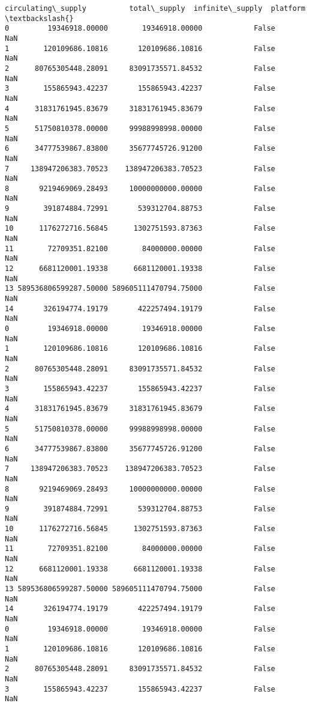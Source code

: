 \documentclass[11pt]{article}
\begin{document}
\begin{tcolorbox}[breakable, size=fbox, boxrule=.5pt, pad at break*=1mm, opacityfill=0]
\begin{Verbatim}[commandchars=\\\{\}]
      circulating\_supply          total\_supply  infinite\_supply  platform  \textbackslash{}
0         19346918.00000        19346918.00000            False       NaN
1        120109686.10816       120109686.10816            False       NaN
2      80765305448.28091     83091735571.84532            False       NaN
3        155865943.42237       155865943.42237            False       NaN
4      31831761945.83679     31831761945.83679            False       NaN
5      51750810378.00000     99988998998.00000            False       NaN
6      34777539867.83800     35677745726.91200            False       NaN
7     138947206383.70523    138947206383.70523            False       NaN
8       9219469069.28493     10000000000.00000            False       NaN
9        391874884.72991       539312704.88753            False       NaN
10      1176272716.56845      1302751593.87363            False       NaN
11        72709351.82100        84000000.00000            False       NaN
12      6681120001.19338      6681120001.19338            False       NaN
13 589536806599287.50000 589605111470794.75000            False       NaN
14       326194774.19179       422257494.19179            False       NaN
0         19346918.00000        19346918.00000            False       NaN
1        120109686.10816       120109686.10816            False       NaN
2      80765305448.28091     83091735571.84532            False       NaN
3        155865943.42237       155865943.42237            False       NaN
4      31831761945.83679     31831761945.83679            False       NaN
5      51750810378.00000     99988998998.00000            False       NaN
6      34777539867.83800     35677745726.91200            False       NaN
7     138947206383.70523    138947206383.70523            False       NaN
8       9219469069.28493     10000000000.00000            False       NaN
9        391874884.72991       539312704.88753            False       NaN
10      1176272716.56845      1302751593.87363            False       NaN
11        72709351.82100        84000000.00000            False       NaN
12      6681120001.19338      6681120001.19338            False       NaN
13 589536806599287.50000 589605111470794.75000            False       NaN
14       326194774.19179       422257494.19179            False       NaN
0         19346918.00000        19346918.00000            False       NaN
1        120109686.10816       120109686.10816            False       NaN
2      80765305448.28091     83091735571.84532            False       NaN
3        155865943.42237       155865943.42237            False       NaN

\end{Verbatim}
\end{tcolorbox}
\end{document}
